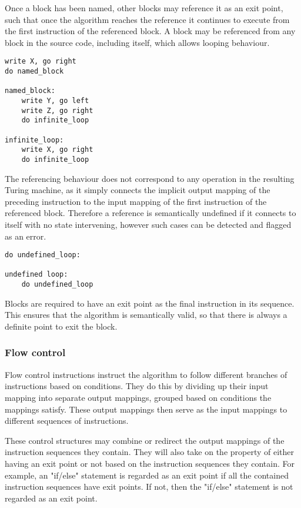 \documentclass[11pt]{article}
\begin{document}
Once a block has been named, other blocks may reference it as an exit point, such that once the algorithm reaches the reference it continues to execute from the first instruction of the referenced block. A block may be referenced from any block in the source code, including itself, which allows looping behaviour.

\begin{verbatim}
write X, go right
do named_block

named_block:
    write Y, go left
    write Z, go right
    do infinite_loop

infinite_loop:
    write X, go right
    do infinite_loop
\end{verbatim}

The referencing behaviour does not correspond to any operation in the resulting Turing machine, as it simply connects the implicit output mapping of the preceding instruction to the input mapping of the first instruction of the referenced block. Therefore a reference is semantically undefined if it connects to itself with no state intervening, however such cases can be detected and flagged as an error.

\begin{verbatim}
do undefined_loop:

undefined loop:
    do undefined_loop
\end{verbatim}

Blocks are required to have an exit point as the final instruction in its sequence. This ensures that the algorithm is semantically valid, so that there is always a definite point to exit the block.

\subsubsection{Flow control}

Flow control instructions instruct the algorithm to follow different branches of instructions based on conditions. They do this by dividing up their input mapping into separate output mappings, grouped based on conditions the mappings satisfy. These output mappings then serve as the input mappings to different sequences of instructions.

These control structures may combine or redirect the output mappings of the instruction sequences they contain. They will also take on the property of either having an exit point or not based on the instruction sequences they contain. For example, an "if/else" statement is regarded as an exit point if all the contained instruction sequences have exit points. If not, then the "if/else" statement is not regarded as an exit point.
\end{document}
